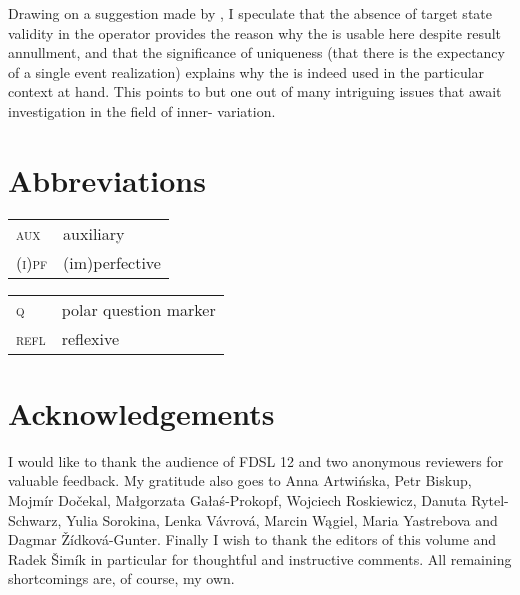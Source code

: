 \documentclass[output=paper,modfonts,newtxmath,hidelinks]{langscibook}
\begin{document}
\noindent Drawing on a suggestion made by \citet[84]{Dickey18}, I speculate that the absence of target state validity in the   operator provides the reason why the  is usable here despite result annullment, 
and that the significance of uniqueness (that there is the expectancy of a single event realization) explains why the  is indeed used in the particular context at hand. 
This points to but one out of many intriguing issues that await investigation in the field of inner-  variation.  






\section*{Abbreviations}

\begin{tabularx}{.5\textwidth}{@{}lQ@{}}
\textsc{aux} & auxiliary \\
\textsc{(i)pf} & (im){perfective}\\
\end{tabularx}%
\begin{tabularx}{.5\textwidth}{@{}lQ@{}}
\textsc{q}&polar question marker\\
\textsc{refl}&reflexive\\
\end{tabularx}


\section*{Acknowledgements}
I would like to thank the audience of FDSL 12 and two anonymous reviewers for valuable feedback. 
My gratitude also goes to 
Anna Artwińska, Petr Biskup, Mojmír Dočekal, Małgorzata Gałaś-Prokopf, Wojciech Roskiewicz, Danuta Rytel-Schwarz, Yulia Sorokina, Lenka Vávrová, Marcin Wągiel, Maria Yastrebova and Dagmar Žídková-Gunter. Finally I wish to thank the editors of this volume and Radek Šimík in particular for thoughtful and instructive comments. 
All remaining shortcomings are, of course, my own.  

{\sloppy
\printbibliography[heading=subbibliography,notkeyword=this]
}
\clearpage 
\end{document}
